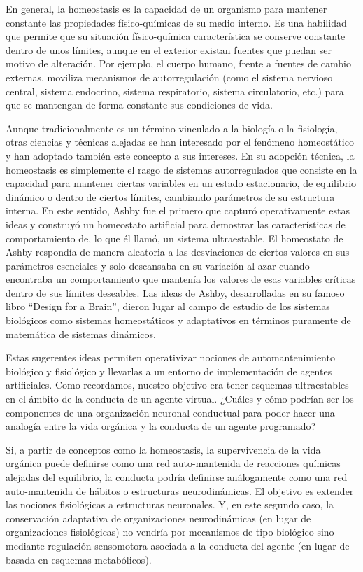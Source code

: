 En general, la homeostasis es la capacidad de un organismo para mantener constante las propiedades físico-químicas de su medio interno. Es una habilidad que permite que su situación físico-química característica se conserve constante dentro de unos límites, aunque en el exterior existan fuentes que puedan ser motivo de alteración. Por ejemplo, el cuerpo humano, frente a fuentes de cambio externas, moviliza mecanismos de autorregulación (como el sistema nervioso central, sistema endocrino, sistema respiratorio, sistema circulatorio, etc.) para que se mantengan de forma constante sus condiciones de vida.

Aunque tradicionalmente es un término vinculado a la biología o la fisiología, otras ciencias y técnicas alejadas se han interesado por el fenómeno homeostático y han adoptado también este concepto a sus intereses. En su adopción técnica, la homeostasis es simplemente el rasgo de sistemas autorregulados que consiste en la capacidad para mantener ciertas variables en un estado estacionario, de equilibrio dinámico o dentro de ciertos límites, cambiando parámetros de su estructura interna. En este sentido, Ashby fue el primero que capturó operativamente estas ideas y construyó un homeostato artificial para demostrar las características de comportamiento de, lo que él llamó, un sistema ultraestable. El homeostato de Ashby respondía de manera aleatoria a las desviaciones de ciertos valores en sus parámetros esenciales y solo descansaba en su variación al azar cuando encontraba un comportamiento que mantenía los valores de esas variables críticas dentro de sus límites deseables. Las ideas de Ashby, desarrolladas en su famoso libro ``Design for a Brain'', dieron lugar al campo de estudio de los sistemas biológicos como sistemas homeostáticos y adaptativos en términos puramente de matemática de sistemas dinámicos.

Estas sugerentes ideas permiten operativizar nociones de automantenimiento biológico y fisiológico y llevarlas a un entorno de implementación de agentes artificiales. Como recordamos, nuestro objetivo era tener esquemas ultraestables en el ámbito de la conducta de un agente virtual. ¿Cuáles y cómo podrían ser los componentes de una organización neuronal-conductual para poder hacer una analogía entre la vida orgánica y la conducta de un agente programado?

Si, a partir de conceptos como la homeostasis, la supervivencia de la vida orgánica puede definirse como una red auto-mantenida de reacciones químicas alejadas del equilibrio, la conducta podría definirse análogamente como una red auto-mantenida de hábitos o estructuras neurodinámicas. El objetivo es extender las nociones fisiológicas a estructuras neuronales. Y, en este segundo caso, la conservación adaptativa de organizaciones neurodinámicas (en lugar de organizaciones fisiológicas) no vendría por mecanismos de tipo biológico sino mediante regulación sensomotora asociada a la conducta del agente (en lugar de basada en esquemas metabólicos).

